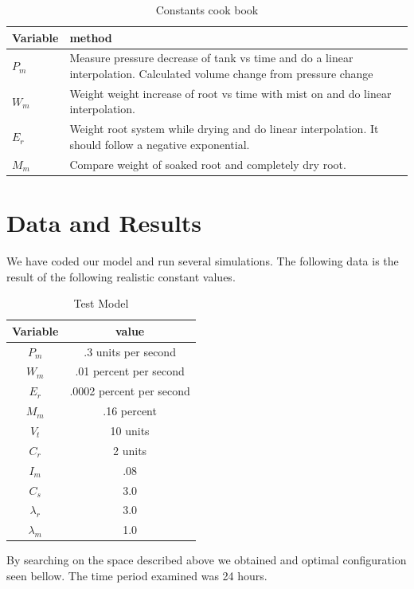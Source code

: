 \documentclass[a4paper,12pt]{article}
\begin{document}
\begin{table}[ht]
\caption{Constants cook book}
\centering
\begin{tabular} {p{1 cm} p{9cm}}
\hline\hline
 Variable & method \\ [0.5ex]
\hline
$P_m$ & Measure pressure decrease of tank vs time and do a linear interpolation. Calculated volume change from pressure change \\
$W_m$ & Weight weight increase of root vs time with mist on and do linear interpolation. \cite{varney1993rates} \\
$E_r$ & Weight root system while drying and do linear interpolation. It should follow a negative exponential. \\ 
$M_m$ & Compare weight of soaked root and completely dry root. \\ 
\hline
\end{tabular}
\end{table}


\section{Data and Results}

We have coded our model and run several simulations. The following data is the result of the following realistic constant values.


\begin{table}[ht]
\caption{Test Model}
\centering
\begin{tabular} {c c}
\hline\hline
 Variable & value \\ [0.5ex]
\hline
$P_m$ & .3 units per second\\
$W_m$ & .01 percent per second \\
$E_r$ & .0002 percent per second\\ 
$M_m$ & .16 percent \\ 
$V_t$ & 10 units \\
$C_r$ & 2 units \\
$I_m$ & .08 \\
$C_s$ & 3.0 \\
$\lambda_r$ & 3.0 \\
$\lambda_m$ & 1.0 \\ 
\hline
\end{tabular}
\end{table}

By searching on the space described above we obtained and optimal configuration seen bellow. The time period examined was 24 hours.
\end{document}
